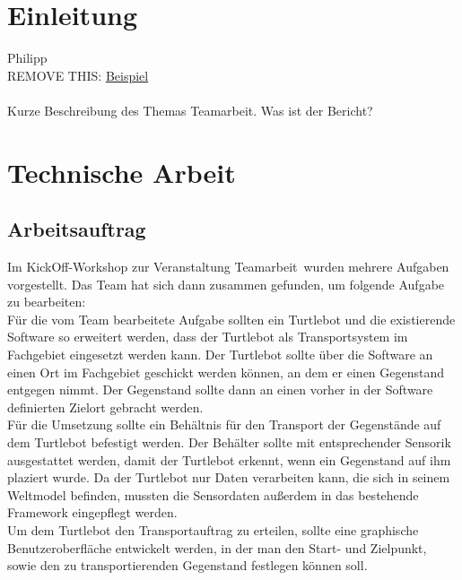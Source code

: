 \documentclass[a4paper,12pt,headsepline]{scrartcl}
\begin{document}
	\tableofcontents
	\newpage
	
	\section{Einleitung}
		Philipp\\
		REMOVE THIS: \href{https://docs.google.com/document/d/1wGlFley6lwhnpLsj8ms7M6fnOjplazlHNr8Bfbv3vso/edit}{Beispiel}\\\\
		Kurze Beschreibung des Themas Teamarbeit. Was ist der Bericht?
	\newpage
	\section{Technische Arbeit}
	
	\subsection{Arbeitsauftrag}
Im KickOff-Workshop zur Veranstaltung \glqq Teamarbeit\grqq\ wurden mehrere Aufgaben vorgestellt. Das Team hat sich dann zusammen gefunden, um folgende Aufgabe zu bearbeiten: \\
Für die vom Team bearbeitete Aufgabe sollten ein Turtlebot und die existierende Software so erweitert werden, dass der Turtlebot als Transportsystem im Fachgebiet eingesetzt werden kann. Der Turtlebot sollte über die Software an einen Ort im Fachgebiet geschickt werden können, an dem er einen Gegenstand entgegen nimmt. Der Gegenstand sollte dann an einen vorher in der Software definierten Zielort gebracht werden. \\
Für die Umsetzung sollte ein Behältnis  für den Transport der Gegenstände auf dem Turtlebot befestigt werden. Der Behälter sollte mit entsprechender Sensorik ausgestattet werden, damit der Turtlebot erkennt, wenn ein Gegenstand auf ihm plaziert wurde. Da der Turtlebot nur Daten verarbeiten kann, die sich in seinem Weltmodel befinden, mussten die Sensordaten außerdem in das bestehende Framework eingepflegt werden.\\
Um dem Turtlebot den Transportauftrag zu erteilen, sollte eine graphische Benutzeroberfläche entwickelt werden, in der man den Start- und Zielpunkt, sowie den zu transportierenden Gegenstand festlegen können soll.  

		
	
\end{document}
